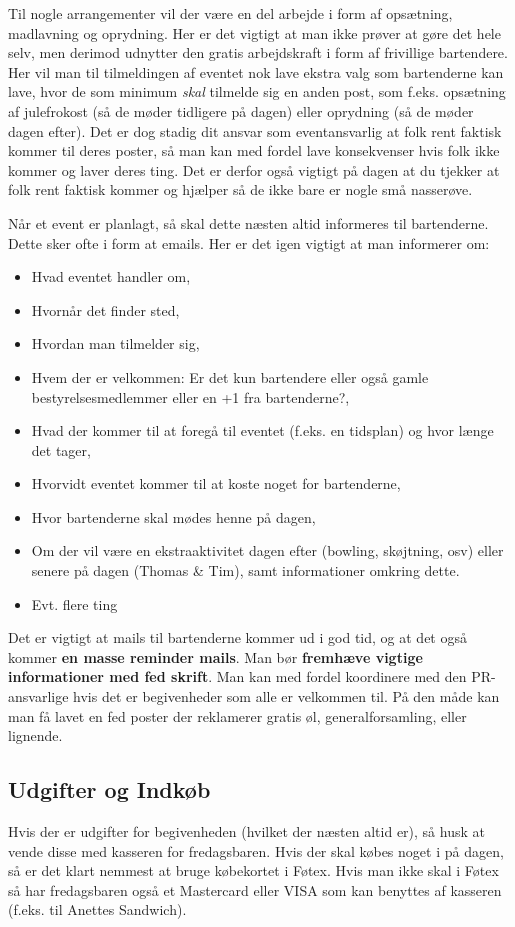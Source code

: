 Til nogle arrangementer vil der være en del arbejde i form af opsætning, madlavning og oprydning. Her er det vigtigt at man ikke prøver at gøre det hele selv,
men derimod udnytter den gratis arbejdskraft i form af frivillige bartendere. Her vil man til tilmeldingen af eventet nok lave ekstra valg som bartenderne kan lave, hvor de som minimum \textit{skal} tilmelde sig en anden post, som f.eks. opsætning af julefrokost (så de møder tidligere på dagen) eller oprydning (så de møder dagen efter). Det er dog stadig dit ansvar som eventansvarlig at folk rent faktisk kommer til deres poster, så man kan med fordel lave konsekvenser hvis folk ikke kommer og laver deres ting. Det er derfor også vigtigt på dagen at du tjekker at folk rent faktisk kommer og hjælper så de ikke bare er nogle små nasserøve.

Når et event er planlagt, så skal dette næsten altid informeres til bartenderne. Dette sker ofte i form at emails. Her er det igen vigtigt at man informerer om:
\begin{itemize}
    \item Hvad eventet handler om,
    \item Hvornår det finder sted,
    \item Hvordan man tilmelder sig,
    \item Hvem der er velkommen: Er det kun bartendere eller også gamle bestyrelsesmedlemmer eller en +1 fra bartenderne?,
    \item Hvad der kommer til at foregå til eventet (f.eks. en tidsplan) og hvor længe det tager,
    \item Hvorvidt eventet kommer til at koste noget for bartenderne,
    \item Hvor bartenderne skal mødes henne på dagen,
    \item Om der vil være en ekstraaktivitet dagen efter (bowling, skøjtning, osv) eller senere på dagen (Thomas \& Tim), samt informationer omkring dette.
    \item Evt. flere ting
\end{itemize}

\noindent Det er vigtigt at mails til bartenderne kommer ud i god tid, og at det også kommer \textbf{en masse reminder mails}. Man bør \textbf{fremhæve vigtige informationer med fed skrift}. Man kan med fordel koordinere med den PR-ansvarlige hvis det er begivenheder som alle er velkommen til. På den måde kan man få lavet en fed poster der reklamerer gratis øl, generalforsamling, eller lignende.

\subsection*{Udgifter og Indkøb}
Hvis der er udgifter for begivenheden (hvilket der næsten altid er), så husk at vende disse med kasseren for fredagsbaren. Hvis der skal købes noget i på dagen, så er det klart nemmest at bruge købekortet i Føtex. Hvis man ikke skal i Føtex så har fredagsbaren også et Mastercard eller VISA som kan benyttes af kasseren (f.eks. til Anettes Sandwich).

